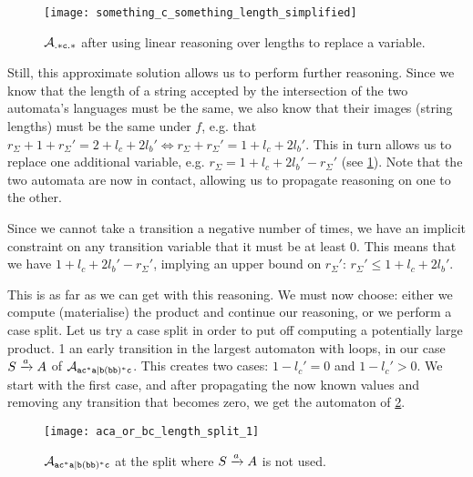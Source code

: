 \documentclass[acmsmall,review,anonymous,screen]{acmart}\settopmatter{printfolios=true,printccs=false,printacmref=true}
\theoremstyle{definition}
\begin{document}
\begin{figure}[t]
  \centering 
    \texttt{[image: something\_c\_something\_length\_simplified]}
    \caption{$\mathcal{A}_{\mathtt{.*c.*}}{}$ after using linear reasoning over lengths to replace a variable.}\label{fig:example-length-reduced}
  \end{figure}

Still, this approximate solution allows us to perform further reasoning. Since
we know that the length of a string accepted by the intersection of the two
automata's languages must be the same, we also know that their images (string
lengths) must be the same under $f$, e.g. that $r_\Sigma + 1 + r_\Sigma' = 2 +
l_c + 2l_b' \iff r_\Sigma + r_\Sigma' = 1 + l_c + 2l_b'$. This in turn allows us
to replace one additional variable, e.g. $r_\Sigma = 1 + l_c + 2l_b' -
r_\Sigma'$ (see \cref{fig:example-length-reduced}). Note that the two automata
are now in contact, allowing us to propagate reasoning on one to the other.

Since we cannot take a transition a negative number of times, we have an
implicit constraint on any transition variable that it must be at least $0$.
This means that we have $1 + l_c + 2l_b' - r_\Sigma'$, implying an upper bound
on $r_\Sigma'$: $r_\Sigma' \leq 1 + l_c + 2l_b'$.

This is as far as we can get with this reasoning. We must now choose: either we
compute (materialise) the product and continue our reasoning, or we perform a
case split. Let us try a case split in order to put off computing a potentially
large product. 1 an early transition in the largest automaton with loops,
in our case $S \xrightarrow{a} A$ of $\mathcal{A}_{\mathtt{ac^*a|b(bb)^*c}}$. This creates two
cases: $1-l_c' = 0$ and $1-l_c' > 0$. We start with the first case, and after
propagating the now known values and removing any transition that becomes zero,
we get the automaton of \cref{fig:aca-or-bc-length-split-1}.


\begin{figure}[t]
  \centering 
    \texttt{[image: aca\_or\_bc\_length\_split\_1]}
    \caption{$\mathcal{A}_{\mathtt{ac^*a|b(bb)^*c}}{}$ at the split where $S \xrightarrow{a} A$ is not
    used.}\label{fig:aca-or-bc-length-split-1}
  \end{figure}
\end{document}
